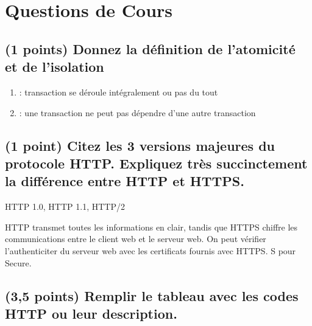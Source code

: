 \documentclass[11pt,a4paper]{article}
\begin{document}
\MakeExamTitle                   %


\section{Questions de Cours}

\subsection{(1 points) Donnez la définition de l'\textbf{atomicité} et de l'\textbf{isolation}}

\begin{enumerate}
\item {} : transaction se déroule intégralement ou pas du tout
\item {} : une transaction ne peut pas dépendre d'une autre transaction
\end{enumerate}

\bigskip

\subsection{(1 point) Citez les 3 versions majeures du protocole HTTP. Expliquez très succinctement la différence entre HTTP et HTTPS.}

\bigskip

HTTP 1.0, HTTP 1.1, HTTP/2

HTTP transmet toutes les informations en clair, tandis que HTTPS chiffre les communications entre le client web et le serveur web.
On peut vérifier l'authenticiter du serveur web avec les certificats fournis avec HTTPS.
S pour Secure.

\bigskip

\subsection{(3,5 points) Remplir le tableau avec les codes HTTP ou leur description.}

\bigskip

\renewcommand\arraystretch{2.5}
\end{document}
